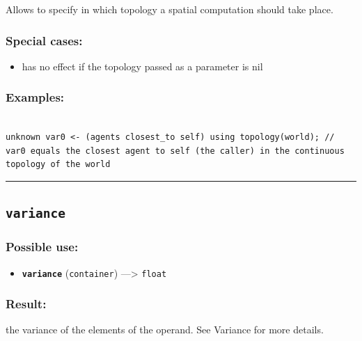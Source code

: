 \documentclass[]{book}
\providecommand{\tightlist}{%
  \setlength{\itemsep}{0pt}\setlength{\parskip}{0pt}}
\theoremstyle{definition}
\theoremstyle{definition}
\theoremstyle{definition}
\theoremstyle{remark}
\begin{document}
Allows to specify in which topology a spatial computation should take
place.

\subsubsection{Special cases:}\label{special-cases-143}

\begin{itemize}
\tightlist
\item
  has no effect if the topology passed as a parameter is nil
\end{itemize}

\subsubsection{Examples:}\label{examples-377}

\begin{verbatim}
 
unknown var0 <- (agents closest_to self) using topology(world); // var0 equals the closest agent to self (the caller) in the continuous topology of the world
\end{verbatim}

\begin{center}\rule{0.5\linewidth}{\linethickness}\end{center}

\subsection{\texorpdfstring{\texttt{variance}}{variance}}\label{variance}

\subsubsection{Possible use:}\label{possible-use-548}

\begin{itemize}
\tightlist
\item
  \textbf{\texttt{variance}} (\texttt{container}) ---\textgreater{}
  \texttt{float}
\end{itemize}

\subsubsection{Result:}\label{result-528}

the variance of the elements of the operand. See Variance for more
details.
\end{document}
